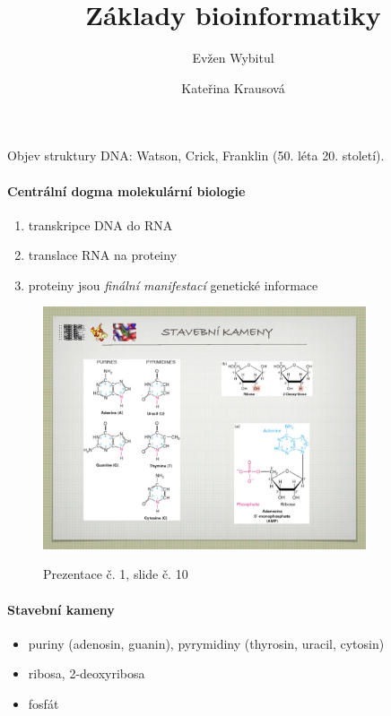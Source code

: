 \documentclass[DIV=8]{scrreprt}
\title{Základy bioinformatiky}
\author{Evžen Wybitul \and Kateřina Krausová}
\begin{document}
\begin{titlepage}
\maketitle
\end{titlepage}
\tableofcontents

Objev struktury DNA: Watson, Crick, Franklin (50. léta 20. století).

\paragraph{Centrální dogma molekulární biologie}
\begin{enumerate}[nosep]
    \item transkripce DNA do RNA
    \item translace RNA na proteiny
    \item proteiny jsou \emph{finální manifestací} genetické informace
\end{enumerate}



\begin{figure}
    \caption{Prezentace č. 1, slide č. 10}
    \includegraphics[width=0.85\textwidth]{slides-1/slide-10.jpg}
    \centering
    \label{slides-1-slide-10}
\end{figure}

\paragraph{Stavební kameny}
\begin{itemize}[nosep]
    \item puriny (adenosin, guanin), pyrymidiny (thyrosin, uracil, cytosin)
    \item ribosa, 2-deoxyribosa
    \item fosfát
\end{itemize}
\end{document}
